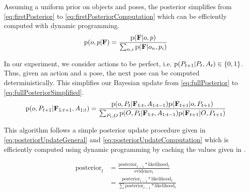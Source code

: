             Assuming a uniform prior on objects and poses, the posterior simplifies from \eqref{eq:firstPosterior} to \eqref{eq:firstPosteriorComputation} which can be efficiently computed with dynamic programming.
            \begin{equation}
                \label{eq:firstPosteriorComputation}
                \text{p}(o,p|\mathbf{F}) = \frac{\text{p}(\mathbf{F}|o,p)}{\sum_{n,i} \text{p}(\mathbf{F}|o_n,p_i)}
            \end{equation}

            In our experiment, we consider actions to be perfect, i.e. $\text{p}(P_{t+1}|P_t,A_t) \in \{ 0 , 1 \}$. Thus, given an action and a pose, the next pose can be computed deterministically. This simplifies our Bayesian update from \eqref{eq:fullPosterior} to \eqref{eq:fullPosteriorSimplified}.
            \begin{equation}
                \label{eq:fullPosteriorSimplified}
                \text{p}(o,P_{t+1}|\mathbf{F}_{1:t+1},A_{1:t}) = \frac{\text{p}(o,P_t|\mathbf{F}_{1:t},A_{1:t-1}) \text{p}(\mathbf{F}_{t+1}|o,P_{t+1}) }{\sum_{P_t,O} \text{p}(O,P_t|\mathbf{F}_{1:t},A_{1:t-1}) \text{p}(\mathbf{F}_{t+1}|O,P_{t+1}) }
            \end{equation}

            This algorithm follows a simple posterior update procedure given in \eqref{eq:posteriorUpdateGeneral} and \eqref{eq:posteriorUpdateComputation} which is efficiently computed using dynamic programming by caching the values given in .

            \begin{align}
                \label{eq:posteriorUpdateGeneral}
                \text{posterior}_t &= \frac{\text{posterior}_{t-1}*\text{likelihood}_t}{\text{evidence}_t}\\
                \label{eq:posteriorUpdateComputation}
                &= \frac{\text{posterior}_{t-1}*\text{likelihood}_t}{\sum \text{posterior}_{t-1}*\text{likelihood}_t}
            \end{align}

